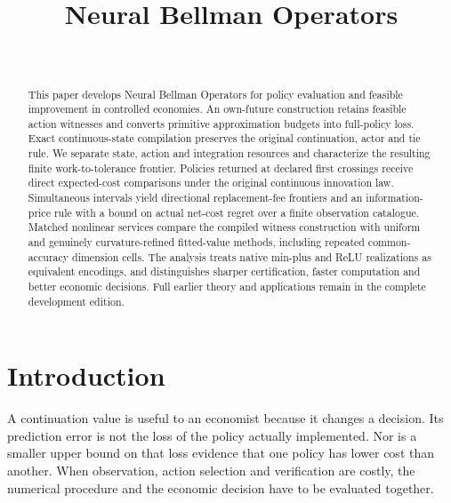 \documentclass[ecta,nameyear,draft]{econsocart}
\begin{document}
\begin{frontmatter}
\title{Neural Bellman Operators}
\begin{aug}
\author[id=au1,addressref={add1}]{~}
\address[id=add1]{Peking University}
\end{aug}
\begin{abstract}
This paper develops Neural Bellman Operators for policy evaluation and feasible improvement in controlled economies. An own-future construction retains feasible action witnesses and converts primitive approximation budgets into full-policy loss. Exact continuous-state compilation preserves the original continuation, actor and tie rule. We separate state, action and integration resources and characterize the resulting finite work-to-tolerance frontier. Policies returned at declared first crossings receive direct expected-cost comparisons under the original continuous innovation law. Simultaneous intervals yield directional replacement-fee frontiers and an information-price rule with a bound on actual net-cost regret over a finite observation catalogue. Matched nonlinear services compare the compiled witness construction with uniform and genuinely curvature-refined fitted-value methods, including repeated common-accuracy dimension cells. The analysis treats native min-plus and ReLU realizations as equivalent encodings, and distinguishes sharper certification, faster computation and better economic decisions. Full earlier theory and applications remain in the complete development edition.
\end{abstract}
\begin{keyword}
\end{keyword}
\end{frontmatter}
\section{Introduction}\label{sec:introduction49}
A continuation value is useful to an economist because it changes a decision. Its prediction error is not the loss of the policy actually implemented. Nor is a smaller upper bound on that loss evidence that one policy has lower cost than another. When observation, action selection and verification are costly, the numerical procedure and the economic decision have to be evaluated together.
\end{document}
